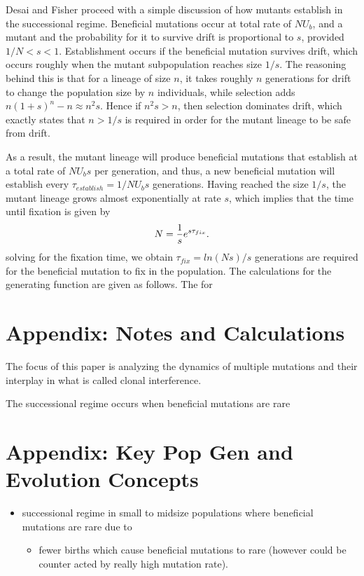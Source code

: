 \documentclass[12pt,twocolumn]{article}
\begin{document}
Desai and Fisher proceed with a simple discussion of how mutants establish in the successional regime.  Beneficial mutations occur at total rate of $NU_b$, and a mutant and the probability for it to survive drift is proportional to $s$, provided $1/N<s<1$.  Establishment occurs if the beneficial mutation survives drift, which occurs roughly when the mutant subpopulation reaches size $1/s$.  The reasoning behind this is that for a lineage of size $n$, it takes roughly $n$ generations for drift to change the population size by $n$ individuals, while selection adds $n(1+s)^n-n \approx n^2s$.  Hence if $n^2s>n$, then selection dominates drift, which exactly states that $n>1/s$ is required in order for the mutant lineage to be safe from drift. 

As a result, the mutant lineage will produce beneficial mutations that establish at a total rate of $NU_bs$ per generation, and thus, a new beneficial mutation will establish every $\tau_{establish} = 1/NU_bs$ generations.  Having reached the size $1/s$, the mutant lineage grows almost exponentially at rate $s$, which implies that the time until fixation is given by
\[
N={1 \over s}e^{s \tau_{fix}}.
\]
solving for the fixation time, we obtain $\tau_{fix}=ln(Ns)/s$ generations are required for the beneficial mutation to fix in the population.  
The calculations for the generating function are given as follows. The for

\section*{Appendix: Notes and Calculations}
The focus of this paper is analyzing the dynamics of multiple mutations and their interplay in what is called clonal interference.  

The successional regime occurs when beneficial mutations are rare


\section*{Appendix: Key Pop Gen and Evolution Concepts}
\begin{itemize}
\item successional regime in small to midsize populations where beneficial mutations are rare due to
	\begin{itemize} 
	\item fewer births which cause beneficial mutations to rare (however could be counter acted by really high mutation rate).
	\end{itemize}
\end{itemize}
\end{document}

